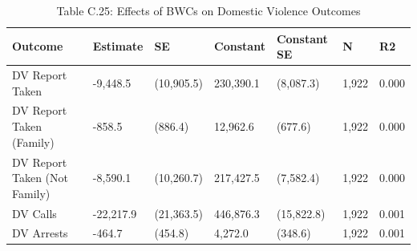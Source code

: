 \begin{table}

\caption{Table C.25: Effects of BWCs on Domestic Violence Outcomes}
\centering
\begin{tabular}[t]{lllllll}
\toprule
Outcome & Estimate & SE & Constant & Constant SE & N & R2\\
\midrule
DV Report Taken & -9,448.5 & (10,905.5) & 230,390.1 & (8,087.3) & 1,922 & 0.000\\
DV Report Taken (Family) & -858.5 & (886.4) & 12,962.6 & (677.6) & 1,922 & 0.000\\
DV Report Taken (Not Family) & -8,590.1 & (10,260.7) & 217,427.5 & (7,582.4) & 1,922 & 0.000\\
DV Calls & -22,217.9 & (21,363.5) & 446,876.3 & (15,822.8) & 1,922 & 0.001\\
DV Arrests & -464.7 & (454.8) & 4,272.0 & (348.6) & 1,922 & 0.001\\
\bottomrule
\end{tabular}
\end{table}
